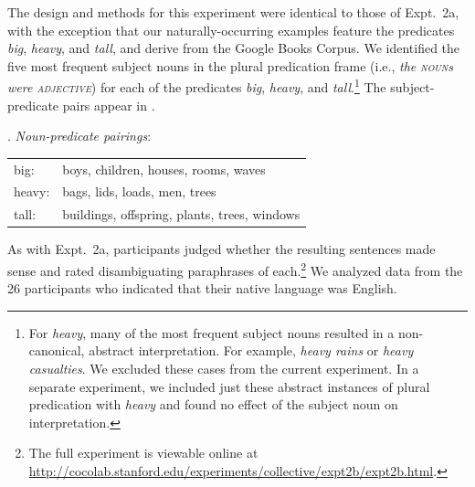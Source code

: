 \documentclass[preprint,12pt,authoryear,titlepage]{elsarticle}
\begin{document}
The design and methods for this experiment were identical to those of Expt.~2a, with the exception that our naturally-occurring examples feature the predicates \emph{big}, \emph{heavy}, and \emph{tall}, and derive from the Google Books Corpus. We identified the five most frequent subject nouns in the plural predication frame (i.e., \emph{the \textsc{noun}s were \textsc{adjective}}) for each of the predicates \emph{big}, \emph{heavy}, and \emph{tall}.\footnote{For \emph{heavy}, many of the most frequent subject nouns resulted in a non-canonical, abstract interpretation. For example, \emph{heavy rains} or \emph{heavy casualties}. We excluded these cases from the current experiment. In a separate experiment, we included just these abstract instances of plural predication with \emph{heavy} and found no effect of the subject noun on interpretation.} The subject-predicate pairs appear in \Next.

\ex. \emph{Noun-predicate pairings}:\\[2pt]
\begin{tabular}{ll}
	big:& boys, children, houses, rooms, waves\\
	heavy:& bags, lids, loads, men, trees\\
	tall:& buildings, offspring, plants, trees, windows
\end{tabular}	

As with Expt.~2a, participants judged whether the resulting sentences made sense and rated disambiguating paraphrases of each.\footnote{The full experiment is viewable online at \url{http://cocolab.stanford.edu/experiments/collective/expt2b/expt2b.html}.}  We analyzed data from the 26 participants who indicated that their native language was English.
\end{document}
